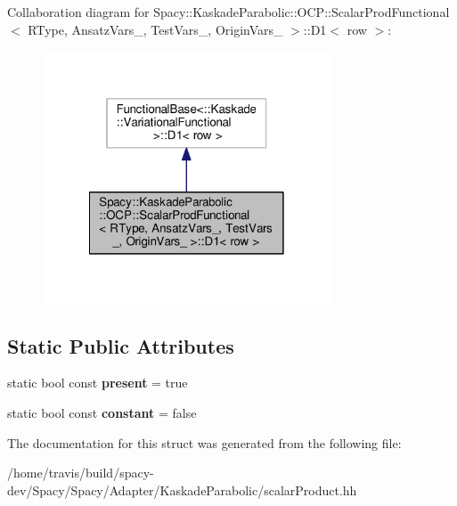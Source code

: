 Collaboration diagram for Spacy\-:\-:Kaskade\-Parabolic\-:\-:O\-C\-P\-:\-:Scalar\-Prod\-Functional$<$ R\-Type, Ansatz\-Vars\-\_\-, Test\-Vars\-\_\-, Origin\-Vars\-\_\- $>$\-:\-:D1$<$ row $>$\-:
\nopagebreak
\begin{figure}[H]
\begin{center}
\leavevmode
\includegraphics[width=242pt]{structSpacy_1_1KaskadeParabolic_1_1OCP_1_1ScalarProdFunctional_1_1D1__coll__graph}
\end{center}
\end{figure}
\subsection*{Static Public Attributes}
\begin{DoxyCompactItemize}
\item 
\hypertarget{structSpacy_1_1KaskadeParabolic_1_1OCP_1_1ScalarProdFunctional_1_1D1_ae6d5671ee7ffd409099448c7c5a6dd9d}{static bool const {\bfseries present} = true}\label{structSpacy_1_1KaskadeParabolic_1_1OCP_1_1ScalarProdFunctional_1_1D1_ae6d5671ee7ffd409099448c7c5a6dd9d}

\item 
\hypertarget{structSpacy_1_1KaskadeParabolic_1_1OCP_1_1ScalarProdFunctional_1_1D1_ace370a60037d95bc5b9f971273404058}{static bool const {\bfseries constant} = false}\label{structSpacy_1_1KaskadeParabolic_1_1OCP_1_1ScalarProdFunctional_1_1D1_ace370a60037d95bc5b9f971273404058}

\end{DoxyCompactItemize}


The documentation for this struct was generated from the following file\-:\begin{DoxyCompactItemize}
\item 
/home/travis/build/spacy-\/dev/\-Spacy/\-Spacy/\-Adapter/\-Kaskade\-Parabolic/scalar\-Product.\-hh\end{DoxyCompactItemize}
